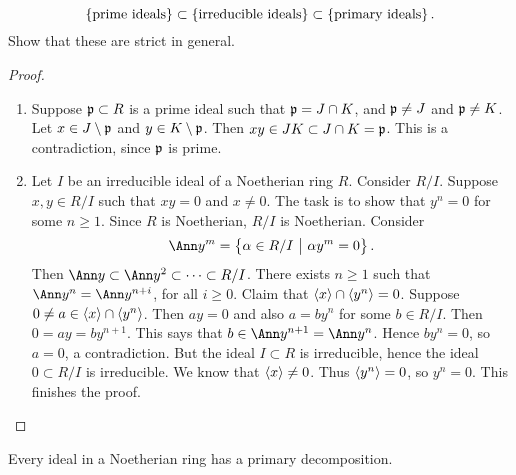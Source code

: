 \begin{exercise*}
$$ \cbr{\text{prime ideals}} \subset \cbr{\text{irreducible ideals}} \subset \cbr{\text{primary ideals}}. $$
Show that these are strict in general.
\end{exercise*}

\pagebreak

\begin{proof}
\hfill
\begin{enumerate}
\item Suppose $ \mathfrak{p} \subset R $ is a prime ideal such that $ \mathfrak{p} = J \cap K $, and $ \mathfrak{p} \ne J $ and $ \mathfrak{p} \ne K $. Let $ x \in J \setminus \mathfrak{p} $ and $ y \in K \setminus \mathfrak{p} $. Then $ xy \in JK \subset J \cap K = \mathfrak{p} $. This is a contradiction, since $ \mathfrak{p} $ is prime.
\item Let $ I $ be an irreducible ideal of a Noetherian ring $ R $. Consider $ R / I $. Suppose $ x, y \in R / I $ such that $ xy = 0 $ and $ x \ne 0 $. The task is to show that $ y^n = 0 $ for some $ n \ge 1 $. Since $ R $ is Noetherian, $ R / I $ is Noetherian. Consider
$$ \Ann y^m = \cbr{\alpha \in R / I \st \alpha y^m = 0}. $$
Then $ \Ann y \subset \Ann y^2 \subset \dots \subset R / I $. There exists $ n \ge 1 $ such that $ \Ann y^n = \Ann y^{n + i} $, for all $ i \ge 0 $. Claim that $ \left\langle x \right\rangle \cap \left\langle y^n \right\rangle = 0 $. Suppose $ 0 \ne a \in \left\langle x \right\rangle \cap \left\langle y^n \right\rangle $. Then $ ay = 0 $ and also $ a = by^n $ for some $ b \in R / I $. Then $ 0 = ay = by^{n + 1} $. This says that $ b \in \Ann y^{n + 1} = \Ann y^n $. Hence $ by^n = 0 $, so $ a = 0 $, a contradiction. But the ideal $ I \subset R $ is irreducible, hence the ideal $ 0 \subset R / I $ is irreducible. We know that $ \left\langle x \right\rangle \ne 0 $. Thus $ \left\langle y^n \right\rangle = 0 $, so $ y^n = 0 $. This finishes the proof.
\end{enumerate}
\end{proof}


\begin{theorem}[Noether]
Every ideal in a Noetherian ring has a primary decomposition.
\end{theorem}


